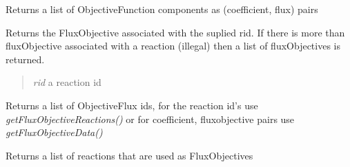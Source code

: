 \documentclass[a4paper,11pt,english]{sphinxmanual}
\begin{document}
\begin{fulllineitems}
\begin{fulllineitems}
\begin{itemize}
\end{itemize}

\end{fulllineitems}


\begin{fulllineitems}
\label{modules_doc:cbmpy.CBModel.Objective.getFluxObjectiveData}
Returns a list of ObjectiveFunction components as (coefficient, flux) pairs

\end{fulllineitems}


\begin{fulllineitems}
\label{modules_doc:cbmpy.CBModel.Objective.getFluxObjectiveForReaction}
Returns the FluxObjective associated with the suplied rid. If there is more than fluxObjective associated with a reaction (illegal)
then a list of fluxObjectives is returned.
\begin{quote}

\emph{rid} a reaction id
\end{quote}

\end{fulllineitems}


\begin{fulllineitems}
\label{modules_doc:cbmpy.CBModel.Objective.getFluxObjectiveIDs}
Returns a list of ObjectiveFlux ids, for the reaction id's use \emph{getFluxObjectiveReactions()}
or for coefficient, fluxobjective pairs use \emph{getFluxObjectiveData()}

\end{fulllineitems}


\begin{fulllineitems}
\label{modules_doc:cbmpy.CBModel.Objective.getFluxObjectiveReactions}
Returns a list of reactions that are used as FluxObjectives

\end{fulllineitems}


\end{fulllineitems}
\end{document}
